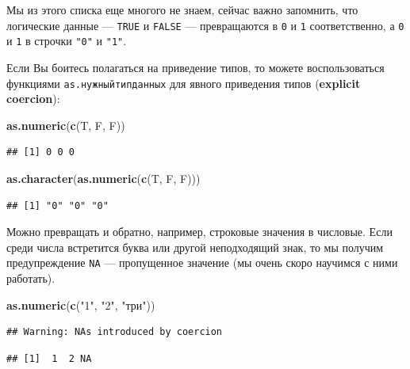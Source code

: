 \documentclass[
]{book}
\newenvironment{Shaded}{\begin{snugshade}}{\end{snugshade}}
\newcommand{\KeywordTok}[1]{\textcolor[rgb]{0.13,0.29,0.53}{\textbf{#1}}}
\newcommand{\NormalTok}[1]{#1}
\newcommand{\StringTok}[1]{\textcolor[rgb]{0.31,0.60,0.02}{#1}}
\begin{document}
Мы из этого списка еще многого не знаем, сейчас важно запомнить, что логические данные --- \texttt{TRUE} и \texttt{FALSE} --- превращаются в \texttt{0} и \texttt{1} соответственно, а \texttt{0} и \texttt{1} в строчки \texttt{"0"} и \texttt{"1"}.

Если Вы боитесь полагаться на приведение типов, то можете воспользоваться функциями \texttt{as.нужныйтипданных} для явного приведения типов (\textbf{explicit coercion}):

\begin{Shaded}
\begin{Highlighting}[]
\KeywordTok{as.numeric}\NormalTok{(}\KeywordTok{c}\NormalTok{(T, F, F))}
\end{Highlighting}
\end{Shaded}

\begin{verbatim}
## [1] 0 0 0
\end{verbatim}

\begin{Shaded}
\begin{Highlighting}[]
\KeywordTok{as.character}\NormalTok{(}\KeywordTok{as.numeric}\NormalTok{(}\KeywordTok{c}\NormalTok{(T, F, F)))}
\end{Highlighting}
\end{Shaded}

\begin{verbatim}
## [1] "0" "0" "0"
\end{verbatim}

Можно превращать и обратно, например, строковые значения в числовые. Если среди числа встретится буква или другой неподходящий знак, то мы получим предупреждение \texttt{NA} --- пропущенное значение (мы очень скоро научимся с ними работать).

\begin{Shaded}
\begin{Highlighting}[]
\KeywordTok{as.numeric}\NormalTok{(}\KeywordTok{c}\NormalTok{(}\StringTok{"1"}\NormalTok{, }\StringTok{"2"}\NormalTok{, }\StringTok{"три"}\NormalTok{))}
\end{Highlighting}
\end{Shaded}

\begin{verbatim}
## Warning: NAs introduced by coercion
\end{verbatim}

\begin{verbatim}
## [1]  1  2 NA
\end{verbatim}
\end{document}
